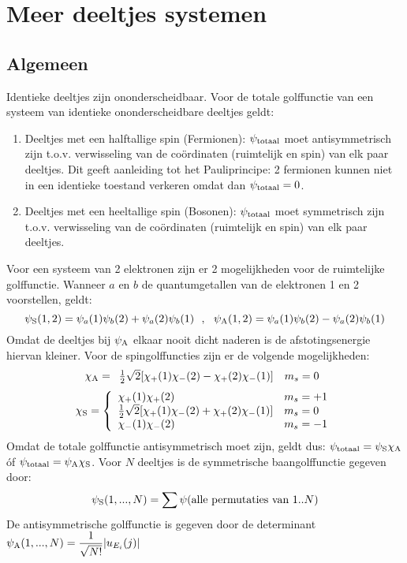 \section[~~Meer deeltjes systemen]{Meer deeltjes systemen}
\subsection[~~Algemeen]{Algemeen}
Identieke deeltjes zijn ononderscheidbaar. Voor de totale golffunctie van een
systeem van identieke ononderscheidbare deeltjes geldt:
\begin{enumerate}
\item Deeltjes met een halftallige spin (Fermionen): $\psi_{\rm totaal}$
      moet antisymmetrisch zijn t.o.v. verwisseling van de co\"ordinaten
      (ruimtelijk en spin) van elk paar deeltjes. Dit geeft aanleiding tot
      het Pauliprincipe: 2 fermionen kunnen niet in een identieke
      toestand verkeren omdat dan $\psi_{\rm totaal}=0$.
\item Deeltjes met een heeltallige spin (Bosonen): $\psi_{\rm totaal}$
      moet symmetrisch zijn t.o.v. verwisseling van de co\"ordinaten
      (ruimtelijk en spin) van elk paar deeltjes.
\end{enumerate}
Voor een systeem van 2 elektronen zijn er 2 mogelijkheden voor de
ruimtelijke golffunctie. Wanneer $a$ en $b$ de quantumgetallen van de
elektronen 1 en 2 voorstellen, geldt:
\[
\psi_{\rm S}(1,2)=\psi_a(1)\psi_b(2)+\psi_a(2)\psi_b(1)~~,~~
\psi_{\rm A}(1,2)=\psi_a(1)\psi_b(2)-\psi_a(2)\psi_b(1)
\]
Omdat de deeltjes bij $\psi_{\rm A}$ elkaar nooit dicht naderen is de
afstotingsenergie hiervan kleiner. Voor de spingolffuncties zijn er de
volgende mogelijkheden:
\[
\chi_{\rm A}=
\begin{array}{ll}
\mbox{$\frac{1}{2}$}\sqrt{2}[\chi_+(1)\chi_-(2)-\chi_+(2)\chi_-(1)]&m_s=0
\end{array}
\]
\[
\chi_{\rm S}=
\left\{\begin{array}{ll}
\chi_+(1)\chi_+(2)&m_s=+1\\
\mbox{$\frac{1}{2}$}\sqrt{2}[\chi_+(1)\chi_-(2)+\chi_+(2)\chi_-(1)]&m_s=0\\
\chi_-(1)\chi_-(2)&m_s=-1
\end{array}\right.
\]
Omdat de totale golffunctie antisymmetrisch moet zijn, geldt dus:
$\psi_{\rm totaal}=\psi_{\rm S}\chi_{\rm A}$ \'of
$\psi_{\rm totaal}=\psi_{\rm A}\chi_{\rm S}$.
\npar
Voor $N$ deeltjes is de symmetrische baangolffunctie gegeven door:
\[
\psi_{\rm S}(1,...,N)=\sum\psi(\mbox{alle permutaties van }1..N)
\]
De antisymmetrische golffunctie is gegeven door de determinant
$\displaystyle\psi_{\rm A}(1,...,N)=\frac{1}{\sqrt{N!}}|u_{E_i}(j)|$

